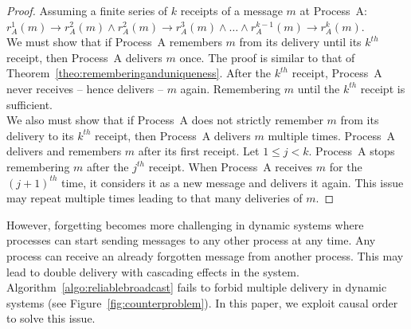 \begin{proof}
  Assuming a finite series of $k$ receipts of a message $m$ at Process~A:
  $r^1_A(m) \rightarrow r^2_A(m) \wedge r^2_A(m) \rightarrow r^3_A(m) \wedge
  \ldots \wedge r^{k-1}_A(m) \rightarrow r^k_A(m)$. \\
  We must show that if Process~A remembers $m$ from its delivery until its
  $k^{th}$ receipt, then Process~A delivers $m$ once. The proof is similar to
  that of Theorem~\ref{theo:rememberinganduniqueness}. After the $k^{th}$
  receipt, Process~A never receives -- hence delivers -- $m$ again. Remembering
  $m$ until the $k^{th}$ receipt is sufficient.\\
  We also must show that if Process~A does not strictly remember $m$ from its
  delivery to its $k^{th}$ receipt, then Process~A delivers $m$ multiple
  times. Process~A delivers and remembers $m$ after its first receipt. Let
  $1\leq j<k$. Process~A stops remembering $m$ after the $j^{th}$ receipt. When
  Process~A receives $m$ for the $(j+1)^{th}$ time, it considers it as a new
  message and delivers it again. This issue may repeat multiple times leading to
  that many deliveries of $m$.
\end{proof}

However, forgetting becomes more challenging in dynamic systems where processes
can start sending messages to any other process at any time. Any process can
receive an already forgotten message from another process. This may lead to
double delivery with cascading effects in the
system. Algorithm~\ref{algo:reliablebroadcast} fails to forbid multiple delivery
in dynamic systems (see Figure~\ref{fig:counterproblem}). In this paper, we
exploit causal order to solve this issue.




